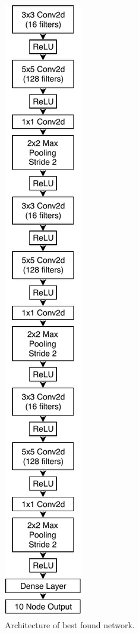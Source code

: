 \documentclass[conference]{IEEEtran}
\begin{document}
\begin{figure}
  \centering
  \includegraphics[height=.45\textheight]{img/best-model}
  \caption{Architecture of best found network.}
  \label{fig:best}
\end{figure}
\end{document}
